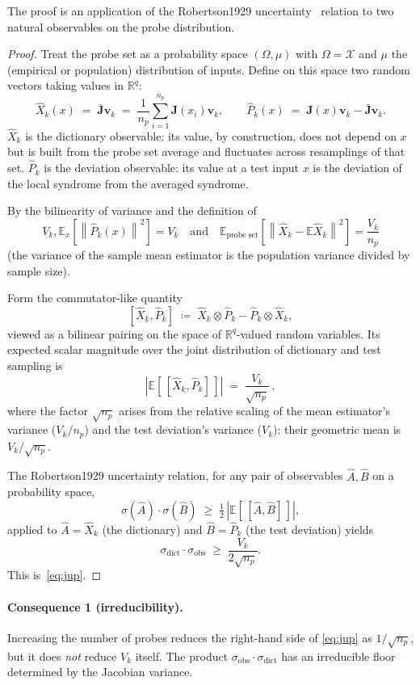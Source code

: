 \documentclass[11pt,a4paper]{article}
\theoremstyle{definition}
\newcommand{\Jm}{\mathbf{J}}
\newcommand{\vk}[1][]{\mathbf{v}_{#1}}
\newcommand{\Rbb}{\mathbb{R}}
\newcommand{\Xop}{\hat{X}}
\newcommand{\Pop}{\hat{P}}
\newcommand{\Aop}{\hat{A}}
\newcommand{\Bop}{\hat{B}}
\newcommand{\Eop}{\mathbb{E}}
\newcommand{\norm}[1]{\left\lVert#1\right\rVert}
\begin{document}
The proof is an application of the Robertson1929 uncertainty~\cite{Robertson1929} relation to two natural observables on the probe distribution.

\begin{proof}
Treat the probe set as a probability space $(\Omega, \mu)$ with $\Omega = \mathcal{X}$ and $\mu$ the (empirical or population) distribution of inputs. Define on this space two random vectors taking values in $\Rbb^q$:
\[
  \Xop_k(x) \;=\; \bar{\Jm}\vk[k] \;=\; \frac{1}{n_p}\sum_{i=1}^{n_p}\Jm(x_i)\vk[k],
  \qquad
  \Pop_k(x) \;=\; \Jm(x)\vk[k] - \bar{\Jm}\vk[k] .
\]
$\Xop_k$ is the dictionary observable: its value, by construction, does not depend on $x$ but is built from the probe set average and fluctuates across resamplings of that set. $\Pop_k$ is the deviation observable: its value at a test input $x$ is the deviation of the local syndrome from the averaged syndrome.

By the bilinearity of variance and the definition of 
\[
    V_k, \Eop_x[\norm{\Pop_k(x)}^2] = V_k
\quad\text{and}\quad
    \Eop_{\text{probe set}} [\norm{\Xop_k - \Eop \Xop_k}^2] = \frac{V_k}{n_p}
\]
(the variance of the sample mean estimator is the population variance divided by sample size).

Form the commutator-like quantity
\[
  [\Xop_k, \Pop_k] \;\coloneqq\;
  \Xop_k \otimes \Pop_k - \Pop_k \otimes \Xop_k,
\]
viewed as a bilinear pairing on the space of $\Rbb^q$-valued random variables. Its expected scalar magnitude over the joint distribution of dictionary and test sampling is
\[
  |\Eop[\,[\Xop_k, \Pop_k]\,]|
  \;=\; \frac{V_k}{\sqrt{n_p}}\, ,
\]
where the factor $\sqrt{n_p}$ arises from the relative scaling of the mean estimator's variance ($V_k/n_p$) and the test deviation's variance ($V_k$): their geometric mean is $V_k/\sqrt{n_p}$.

The Robertson1929 uncertainty relation, for any pair of observables $\Aop, \Bop$ on a probability space,
\[
  \sigma(\Aop)\cdot \sigma(\Bop) \;\geq\; \tfrac{1}{2}\,|\Eop[\,[\Aop, \Bop]\,]|,
\]
applied to $\Aop = \Xop_k$ (the dictionary) and $\Bop = \Pop_k$ (the test deviation) yields
\[
  \sigma_{\mathrm{dict}}\cdot \sigma_{\mathrm{obs}}
  \;\geq\; \frac{V_k}{2\sqrt{n_p}}.
\]
This is~\eqref{eq:jup}.
\end{proof}

\paragraph{Consequence 1 (irreducibility).} 
Increasing the number of probes reduces the right-hand side of \eqref{eq:jup} as $1/\sqrt{n_p}$, but it does \emph{not} reduce $V_k$ itself. The product $\sigma_{\mathrm{obs}}\cdot\sigma_{\mathrm{dict}}$ has an irreducible floor determined by the Jacobian variance.
\end{document}
